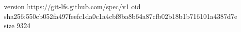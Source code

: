 version https://git-lfs.github.com/spec/v1
oid sha256:550cb052fa497feefc1da0c1a4cbf8ba8b64a87cfb02b18b1b716101a4387d7e
size 9324
